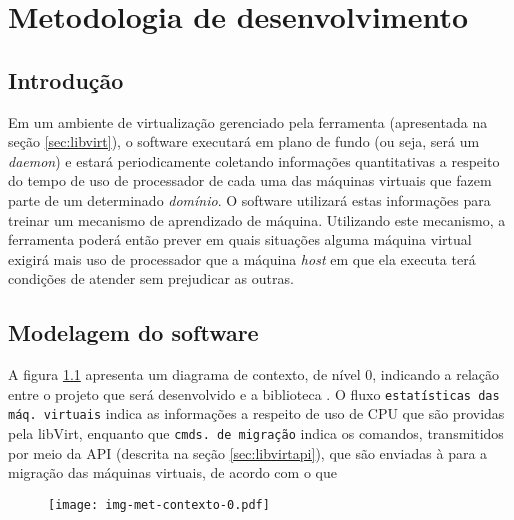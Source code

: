 %
%
%
% 
%
%

\chapter{Metodologia de desenvolvimento}\label{sec:meto}

\section{Introdução}

Em um ambiente de virtualização gerenciado pela ferramenta \libvirt
(apresentada na seção \ref{sec:libvirt}), o software executará em plano de
fundo (ou seja, será um \emph{daemon}) e estará periodicamente coletando
informações quantitativas a respeito do tempo de uso de processador de
cada uma das máquinas virtuais que fazem parte de um determinado
\emph{domínio}. O software utilizará estas informações para treinar um
mecanismo de aprendizado de máquina. Utilizando este mecanismo, a
ferramenta poderá então prever em quais situações alguma máquina virtual
exigirá mais uso de processador que a máquina \emph{host} em que ela
executa terá condições de atender sem prejudicar as outras.

\section{Modelagem do software}

A figura \ref{fig:contexto0} apresenta um diagrama de contexto, de nível 0,
indicando a relação entre o projeto que será desenvolvido e a biblioteca
\libvirt. O fluxo \texttt{estatísticas das máq. virtuais} indica as
informações a respeito de uso de CPU que são providas pela libVirt,
enquanto que \texttt{cmds. de migração} indica os comandos, transmitidos
por meio da API (descrita na seção \ref{sec:libvirtapi}), que são enviadas
à \libVirt para a migração das máquinas virtuais, de acordo com o que 

\begin{figure}
\centering
\texttt{[image: img-met-contexto-0.pdf]}
\label{fig:contexto0}
\end{figure}

